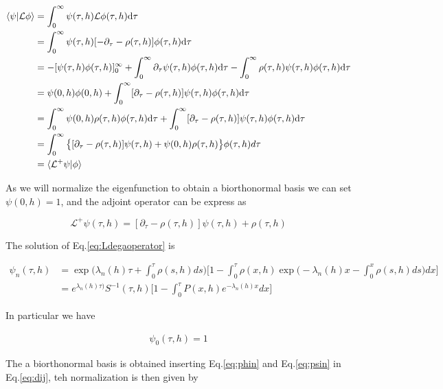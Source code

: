 \documentclass[a4paper,11pt,twoside]{article}
\def \dd  {{\rm d}}
\numberwithin{equation}{section}
\begin{document}
\begin{align}
\langle\psi|\mathcal{L}\phi\rangle&= \int_{0}^{\infty}\psi(\tau,h)\mathcal{L}\phi(\tau,h)\dd\tau  \nonumber \\
&= \int_{0}^{\infty}\psi(\tau,h)[-\partial_{\tau}-\rho(\tau,h)]\phi(\tau,h)\dd\tau  \nonumber \\
&=-[\psi(\tau,h)\phi(\tau,h)]^{\infty}_{0}+\int_{0}^{\infty}\partial_{\tau}\psi(\tau,h)\phi(\tau,h)\dd\tau -\int_{0}^{\infty}\rho(\tau,h)\psi(\tau,h)\phi(\tau,h)\dd\tau \nonumber \\
&= \psi(0,h)\phi(0,h)+ \int_{0}^{\infty}[\partial_{\tau}-\rho(\tau,h)]\psi(\tau,h)\phi(\tau,h)\dd\tau  \nonumber \\
&=\int_{0}^{\infty} \psi(0,h)\rho(\tau,h)\phi(\tau,h)\dd\tau+ \int_{0}^{\infty}[\partial_{\tau}-\rho(\tau,h)]\psi(\tau,h)\phi(\tau,h)\dd\tau  \nonumber \\
&= \int_{0}^{\infty}\big\{[\partial_{\tau}-\rho(\tau,h)]\psi(\tau,h)+ \psi(0,h)\rho(\tau,h)\big\}\phi(\tau,h)d\tau  \nonumber \\
& = \langle\mathcal{L}^+\psi|\phi\rangle
\end{align}


As we will normalize the eigenfunction to obtain a biorthonormal basis we can set $\psi(0,h)=1$, and the adjoint operator can be express as

\begin{equation}
\label{eq:Ldega}
\mathcal{L}^+\psi(\tau,h)=[\partial_{\tau}-\rho(\tau,h)]\psi(\tau,h)+\rho(\tau,h)
\end{equation}

The solution of Eq.\eqref{eq:Ldegaoperator} is

\begin{align}
\label{eq:psin}
\psi_n(\tau,h)&=\exp\big(\lambda_n(h)\tau+\int_0^\tau\rho(s,h)ds\big)\nonumber\big[1-\int^\tau_0 \rho(x,h) \exp\big(-\lambda_n(h)x-\int_0^x\rho(s,h)ds\big)dx\big]\\
&=e^{\lambda_n(h)\tau)}S^{-1}(\tau,h)\big[1-\int^\tau_0 P(x,h) e^{-\lambda_n(h)x}dx\big]
\end{align}

In particular we have

\begin{align}
\label{eq:psi0}
\psi_0(\tau,h)=1
\end{align}



The a biorthonormal basis is obtained inserting Eq.\eqref{eq:phin} and Eq.\eqref{eq:psin} in Eq.\eqref{eq:dij}, teh normalization is then given by 
\end{document}
